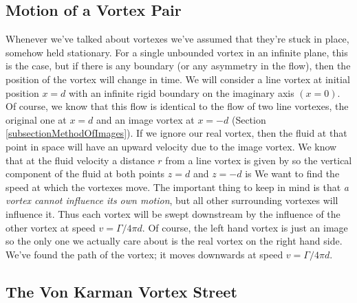 \documentclass[12pt]{book}
\begin{document}
\subsection{Motion of a Vortex Pair}
Whenever we've talked about vortexes we've assumed that they're stuck in place, somehow held stationary.  For a single unbounded vortex in an infinite plane, this is the case, but if there is any boundary (or any asymmetry in the flow), then the position of the vortex will change in time.  We will consider a line vortex at initial position $x=d$ with an infinite rigid boundary on the imaginary axis $(x=0)$.  Of course, we know that this flow is identical to the flow of two line vortexes, the original one at $x=d$ and an image vortex at $x=-d$ (Section \ref{subsectionMethodOfImages}).  If we ignore our real vortex, then the fluid at that point in space will have an upward velocity due to the image vortex.  We know that at the fluid velocity a distance $r$ from a line vortex is given by
so the vertical component of the fluid at both points $z=d$ and $z=-d$ is
We want to find the speed at which the vortexes move.  The important thing to keep in mind is that \textit{a vortex cannot influence its own motion}, but all other surrounding vortexes will influence it.  Thus each vortex will be swept downstream by the influence of the other vortex at speed $v=\Gamma / 4\pi d$.
Of course, the left hand vortex is just an image so the only one we actually care about is the real vortex on the right hand side.  We've found the path of the vortex; it moves downwards at speed $v=\Gamma / 4\pi d$.




\subsection{The Von Karman Vortex Street}
\end{document}

